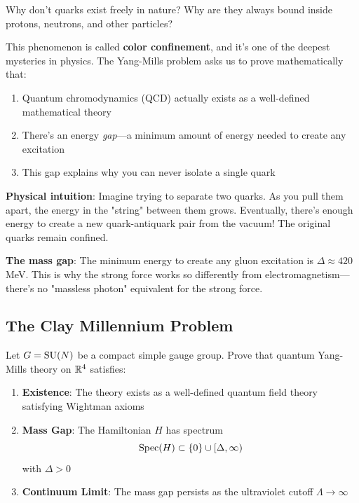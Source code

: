 \begin{intuitive}
Why don't quarks exist freely in nature? Why are they always bound inside protons, neutrons, and other particles?

This phenomenon is called \textbf{color confinement}, and it's one of the deepest mysteries in physics. The Yang-Mills problem asks us to prove mathematically that:
\begin{enumerate}
\item Quantum chromodynamics (QCD) actually exists as a well-defined mathematical theory
\item There's an energy \textit{gap}—a minimum amount of energy needed to create any excitation
\item This gap explains why you can never isolate a single quark
\end{enumerate}

\textbf{Physical intuition}: Imagine trying to separate two quarks. As you pull them apart, the energy in the "string" between them grows. Eventually, there's enough energy to create a new quark-antiquark pair from the vacuum! The original quarks remain confined.

\textbf{The mass gap}: The minimum energy to create any gluon excitation is $\Delta \approx 420$ MeV. This is why the strong force works so differently from electromagnetism—there's no "massless photon" equivalent for the strong force.
\end{intuitive}

\subsection{The Clay Millennium Problem}

\begin{defn}\label{def:ym-problem}
Let $G = \operatorname{SU}(N)$ be a compact simple gauge group. Prove that quantum Yang-Mills theory on $\mathbb{R}^4$ satisfies:

\begin{enumerate}
\item \textbf{Existence}: The theory exists as a well-defined quantum field theory satisfying Wightman axioms\cite{wightman1956quantum}
\item \textbf{Mass Gap}: The Hamiltonian $H$ has spectrum
\begin{equation}
\operatorname{Spec}(H) \subset \{0\} \cup [\Delta, \infty)
\end{equation}
with $\Delta > 0$
\item \textbf{Continuum Limit}: The mass gap persists as the ultraviolet cutoff $\Lambda \to \infty$
\end{enumerate}
\end{defn}

